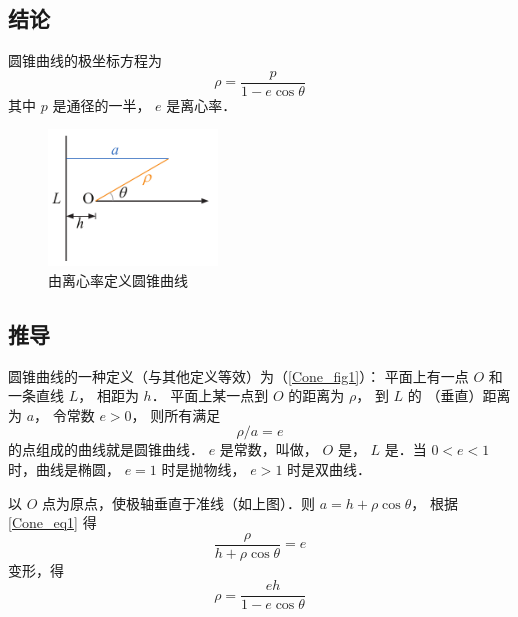

\subsection{结论}
圆锥曲线的极坐标方程为
\begin{equation}
\rho  = \frac{p}{1 - e\cos \theta }
\end{equation}
其中 $p$ 是通径的一半， $e$ 是离心率．

\begin{figure}[ht]
\centering
\includegraphics[width=4.5cm]{./figures/Cone1.pdf}
\caption{由离心率定义圆锥曲线}\label{Cone_fig1}
\end{figure}

\subsection{推导}
圆锥曲线的一种定义（与其他定义等效）为（\autoref{Cone_fig1}）：
平面上有一点 $O$ 和一条直线 $L$， 相距为 $h$． 
平面上某一点到 $O$ 的距离为 $\rho$， 到 $L$ 的
（垂直）距离为 $a$， 令常数 $e > 0$， 则所有满足
\begin{equation}\label{Cone_eq1}
\rho/a = e
\end{equation}
的点组成的曲线就是圆锥曲线． $e$ 是常数，叫做， $O$ 是， $L$ 是．当 $0 < e < 1$ 时，曲线是椭圆， $e = 1$ 时是抛物线， $e > 1$ 时是双曲线．

以 $O$ 点为原点，使极轴垂直于准线（如上图）．则 $a = h + \rho \cos \theta $， 根据\autoref{Cone_eq1} 得
\begin{equation}\label{Cone_eq2}
\frac{\rho }{h + \rho \cos \theta } = e
\end{equation}
变形，得
\begin{equation}\label{Cone_eq3}
\rho  = \frac{eh}{1 - e\cos \theta }
\end{equation}

